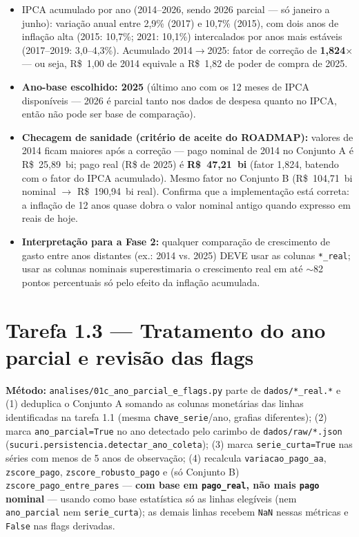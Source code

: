 \documentclass[11pt,a4paper]{article}
\begin{document}
\begin{itemize}
    \item IPCA acumulado por ano (2014--2026, sendo 2026 parcial --- só
    janeiro a junho): variação anual entre 2,9\% (2017) e 10,7\% (2015),
    com dois anos de inflação alta (2015: 10,7\%; 2021: 10,1\%)
    intercalados por anos mais estáveis (2017--2019: 3,0--4,3\%).
    Acumulado 2014$\to$2025: fator de correção de \textbf{1,824$\times$}
    --- ou seja, R\$~1,00 de 2014 equivale a R\$~1,82 de poder de compra de
    2025.
    \item \textbf{Ano-base escolhido: 2025} (último ano com os 12 meses de
    IPCA disponíveis --- 2026 é parcial tanto nos dados de despesa quanto
    no IPCA, então não pode ser base de comparação).
    \item \textbf{Checagem de sanidade (critério de aceite do ROADMAP):}
    valores de 2014 ficam maiores após a correção --- pago nominal de 2014
    no Conjunto A é R\$~25,89~bi; pago real (R\$ de 2025) é
    \textbf{R\$~47,21~bi} (fator 1,824, batendo com o fator do IPCA
    acumulado). Mesmo fator no Conjunto B (R\$~104,71~bi nominal
    $\to$ R\$~190,94~bi real). Confirma que a implementação está correta:
    a inflação de 12 anos quase dobra o valor nominal antigo quando
    expresso em reais de hoje.
    \item \textbf{Interpretação para a Fase 2:} qualquer comparação de
    crescimento de gasto entre anos distantes (ex.: 2014 vs. 2025) DEVE
    usar as colunas \texttt{*\_real}; usar as colunas nominais
    superestimaria o crescimento real em até ${\sim}$82 pontos percentuais
    só pelo efeito da inflação acumulada.
\end{itemize}

\section{Tarefa 1.3 --- Tratamento do ano parcial e revisão das flags}

\textbf{Método:} \texttt{analises/01c\_ano\_parcial\_e\_flags.py} parte de
\texttt{dados/*\_real.*} e (1) deduplica o Conjunto A somando as colunas
monetárias das linhas identificadas na tarefa 1.1 (mesma
\texttt{chave\_serie}/ano, grafias diferentes); (2) marca
\texttt{ano\_parcial=True} no ano detectado pelo carimbo de
\texttt{dados/raw/*.json} (\texttt{sucuri.persistencia.detectar\_ano\_coleta});
(3) marca \texttt{serie\_curta=True} nas séries com menos de 5 anos de
observação; (4) recalcula \texttt{variacao\_pago\_aa},
\texttt{zscore\_pago}, \texttt{zscore\_robusto\_pago} e (só Conjunto B)
\texttt{zscore\_pago\_entre\_pares} --- \textbf{com base em
\texttt{pago\_real}, não mais \texttt{pago} nominal} --- usando como base
estatística só as linhas elegíveis (nem \texttt{ano\_parcial} nem
\texttt{serie\_curta}); as demais linhas recebem \texttt{NaN} nessas
métricas e \texttt{False} nas flags derivadas.
\end{document}
